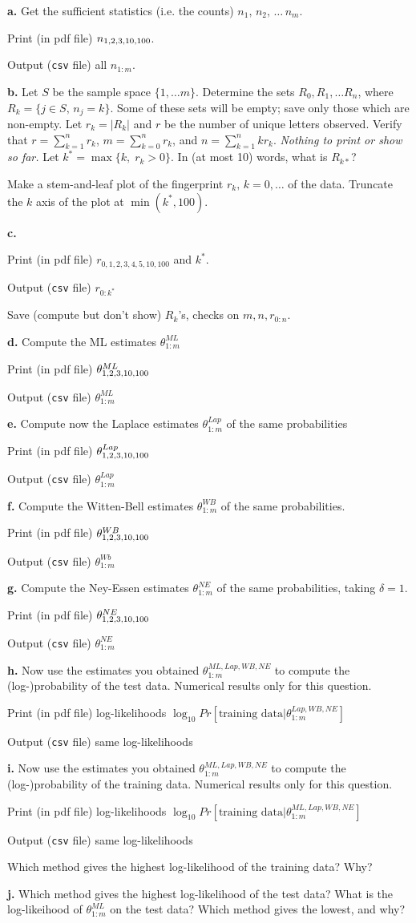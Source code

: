 \documentclass[10pt]{article}
\newenvironment{itemize*}{\begin{itemize}
    \setlength{\topsep}{0ex}
    \setlength{\parskip}{0ex}
    \setlength{\partopsep}{-1ex}
    \setlength{\itemsep}{0pt}
    \setlength{\parsep}{0ex}}
{\end{itemize}}
\newcommand{\bit}{\begin{itemize*}}
\newcommand{\eit}{\end{itemize*}}
\newcommand{\ML}{^{ML}}
\begin{document}
{\bf a.} Get the sufficient statistics (i.e. the  counts) $n_1,\,n_2,\,\ldots \,n_m$.
\bit
\item[Print] (in pdf file)  $n_{1,2,3,10,100}$.
\item[Output]({\tt csv} file)  all $n_{1:m}$.
\eit
{\bf b.} Let $S$ be the sample space $\{ 1,\ldots m\}$. Determine the sets $R_0,R_1,\ldots R_n$, where $R_k=\{j\in S,\,n_j=k\}$. Some of these sets will be empty; save only those which are non-empty. 
Let $r_k=|R_k|$ and $r$ be the number of unique letters observed. Verify that $r=\sum_{k=1}^n r_k$, $m=\sum_{k=0}^nr_k$, and $n=\sum_{k=1}^n kr_k$. {\em Nothing to print or show so far.}
Let $k^*=\max\{k,\;r_k>0\}$. In (at most 10) words, what is $R_{k*}$? 

Make a stem-and-leaf plot of the fingerprint $r_k,\,k=0,\ldots$ of the data. Truncate the $k$ axis of the plot at $\min(k^*,100)$.

{\bf c.}
\bit
\item[Print] (in pdf file)  $r_{0,1,2,3,4,5,10,100}$ and $k^*$.
\item[Output]({\tt csv} file)  $r_{0:k^*}$ 
\item[Save] (compute but don't show) $R_k$'s, checks on $m,n,r_{0:n}$. 
\eit
{\bf d.} Compute the ML estimates $\theta_{1:m}^{ML}$ 
\bit
\item[Print] (in pdf file) $\theta^{ML}_{1,2,3,10,100}$
\item[Output]({\tt csv} file)  $\theta^{ML}_{1:m}$
\eit
{\bf e.} Compute now the Laplace estimates $\theta_{1:m}^{Lap}$ of the same
probabilities
\bit
\item[Print] (in pdf file) $\theta^{Lap}_{1,2,3,10,100}$
\item[Output]({\tt csv} file)  $\theta^{Lap}_{1:m}$
\eit
{\bf f.} Compute the Witten-Bell estimates $\theta_{1:m}^{WB}$ of the same probabilities.
\bit
\item[Print] (in pdf file) $\theta^{WB}_{1,2,3,10,100}$
\item[Output]({\tt csv} file)  $\theta^{Wb}_{1:m}$
\eit
{\bf g.} Compute the Ney-Essen estimates $\theta_{1:m}^{NE}$ of the same probabilities, taking $\delta=1$.
\bit
\item[Print](in pdf file) $\theta^{NE}_{1,2,3,10,100}$
\item[Output]({\tt csv} file)  $\theta^{NE}_{1:m}$
\eit
{\bf h.} Now use the estimates you obtained $\theta_{1:m}^{ML,Lap,WB,NE}$ to compute the
(log-)probability of the test data.  Numerical results only for this question. 
\bit
\item[Print](in pdf file) log-likelihoods $\log_{10}Pr[\text{training data}|\theta_{1:m}^{Lap,WB,NE}]$
\item[Output]({\tt csv} file) same log-likelihoods
  \eit
  {\bf i.} Now use the estimates you obtained $\theta_{1:m}^{ML,Lap,WB,NE}$ to compute the
(log-)probability of the training data.  Numerical results only for this question. 
  \bit
  \item[Print](in pdf file) log-likelihoods $\log_{10}Pr[\text{training data}|\theta_{1:m}^{ML,Lap,WB,NE}]$
\item[Output]({\tt csv} file) same log-likelihoods
  \eit
Which method gives the highest log-likelihood of the training data? Why? 

{\bf j.} Which method gives the highest log-likelihood of the test data? What is the log-likeihood of $\theta_{1:m}\ML$ on the test data? Which method gives the lowest, and why?
\end{document}
